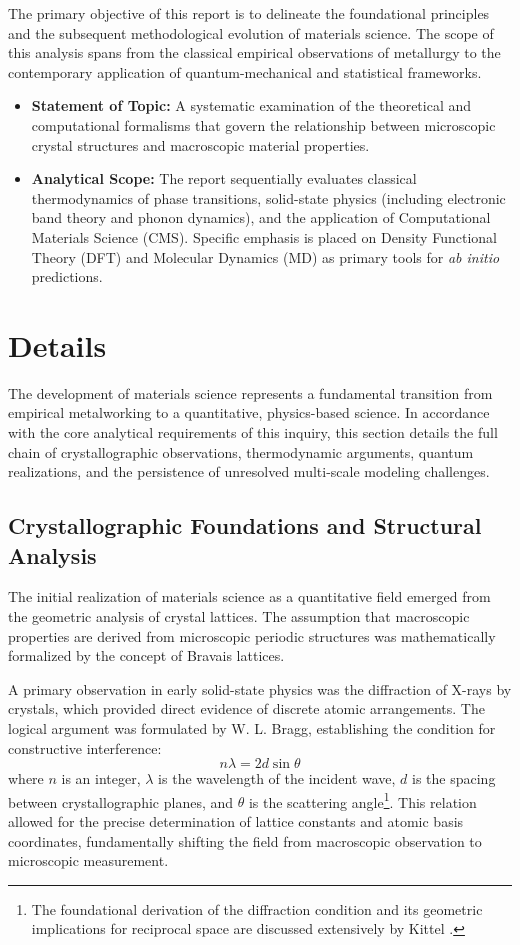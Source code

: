 \documentclass[10pt,a4paper]{article}
\begin{document}
The primary objective of this report is to delineate the foundational principles and the subsequent methodological evolution of materials science. The scope of this analysis spans from the classical empirical observations of metallurgy to the contemporary application of quantum-mechanical and statistical frameworks. 

\begin{itemize}[topsep=1pt,itemsep=1pt]
    \item \textbf{Statement of Topic:} A systematic examination of the theoretical and computational formalisms that govern the relationship between microscopic crystal structures and macroscopic material properties.
    \item \textbf{Analytical Scope:} The report sequentially evaluates classical thermodynamics of phase transitions, solid-state physics (including electronic band theory and phonon dynamics), and the application of Computational Materials Science (CMS). Specific emphasis is placed on Density Functional Theory (DFT) and Molecular Dynamics (MD) as primary tools for \textit{ab initio} predictions. 
\end{itemize}

\section{Details}
\label{sec:details}

The development of materials science represents a fundamental transition from empirical metalworking to a quantitative, physics-based science. In accordance with the core analytical requirements of this inquiry, this section details the full chain of crystallographic observations, thermodynamic arguments, quantum realizations, and the persistence of unresolved multi-scale modeling challenges.

\subsection{Crystallographic Foundations and Structural Analysis}

The initial realization of materials science as a quantitative field emerged from the geometric analysis of crystal lattices. The assumption that macroscopic properties are derived from microscopic periodic structures was mathematically formalized by the concept of Bravais lattices. 

A primary observation in early solid-state physics was the diffraction of X-rays by crystals, which provided direct evidence of discrete atomic arrangements. The logical argument was formulated by W. L. Bragg, establishing the condition for constructive interference:
$$ n\lambda = 2d \sin \theta $$
where $n$ is an integer, $\lambda$ is the wavelength of the incident wave, $d$ is the spacing between crystallographic planes, and $\theta$ is the scattering angle\footnote{The foundational derivation of the diffraction condition and its geometric implications for reciprocal space are discussed extensively by Kittel \cite{kittel2004}.}. This relation allowed for the precise determination of lattice constants and atomic basis coordinates, fundamentally shifting the field from macroscopic observation to microscopic measurement.
\end{document}
